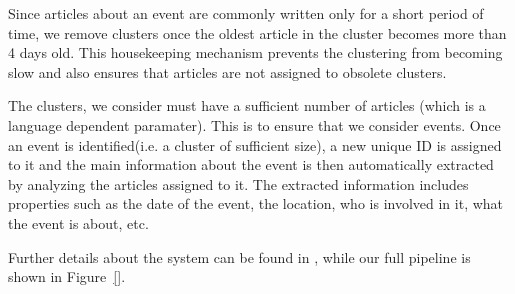 \documentclass[twoside,11pt]{article}
\begin{document}
Since articles about an event are commonly written only for a short period of time, we remove clusters once the oldest article in the cluster becomes more than 4 days old. This housekeeping mechanism prevents the clustering from becoming slow and also ensures that articles are not assigned to obsolete clusters. 

The clusters, we consider must have a sufficient number of articles (which is a language dependent paramater). This is to ensure that we consider events. Once an event is identified(i.e. a cluster of sufficient size), a new unique ID is assigned to it and the main information about the event is then automatically extracted by analyzing the articles assigned to it. The extracted information includes properties such as the date of the event, the location, who is involved in it, what the event is about, etc. 

 Further details about the system can be found in \cite{}, while our full pipeline is shown in Figure~\ref{}.
 
 

\end{document}
